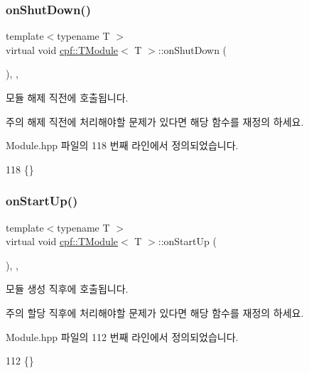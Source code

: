 \subsubsection{\texorpdfstring{on\+Shut\+Down()}{onShutDown()}}
{\footnotesize\ttfamily template$<$typename T $>$ \\
virtual void \hyperlink{classcpf_1_1_t_module}{cpf\+::\+T\+Module}$<$ T $>$\+::on\+Shut\+Down (\begin{DoxyParamCaption}{ }\end{DoxyParamCaption})\hspace{0.3cm}{\ttfamily [inline]}, {\ttfamily [protected]}, {\ttfamily [virtual]}}

모듈 해제 직전에 호출됩니다. \begin{DoxyNote}{주의}
해제 직전에 처리해야할 문제가 있다면 해당 함수를 재정의 하세요. 
\end{DoxyNote}


Module.\+hpp 파일의 118 번째 라인에서 정의되었습니다.


\begin{DoxyCode}
118 \{\}
\end{DoxyCode}
\mbox{\label{classcpf_1_1_t_module_a4eb83b0848794e422d2d345439f51a04}} 
\subsubsection{\texorpdfstring{on\+Start\+Up()}{onStartUp()}}
{\footnotesize\ttfamily template$<$typename T $>$ \\
virtual void \hyperlink{classcpf_1_1_t_module}{cpf\+::\+T\+Module}$<$ T $>$\+::on\+Start\+Up (\begin{DoxyParamCaption}{ }\end{DoxyParamCaption})\hspace{0.3cm}{\ttfamily [inline]}, {\ttfamily [protected]}, {\ttfamily [virtual]}}

모듈 생성 직후에 호출됩니다. \begin{DoxyNote}{주의}
할당 직후에 처리해야할 문제가 있다면 해당 함수를 재정의 하세요. 
\end{DoxyNote}


Module.\+hpp 파일의 112 번째 라인에서 정의되었습니다.


\begin{DoxyCode}
112 \{\}
\end{DoxyCode}
\mbox{\label{classcpf_1_1_t_module_a61452801c61e2546b75a7a6a545e82ee}} 
